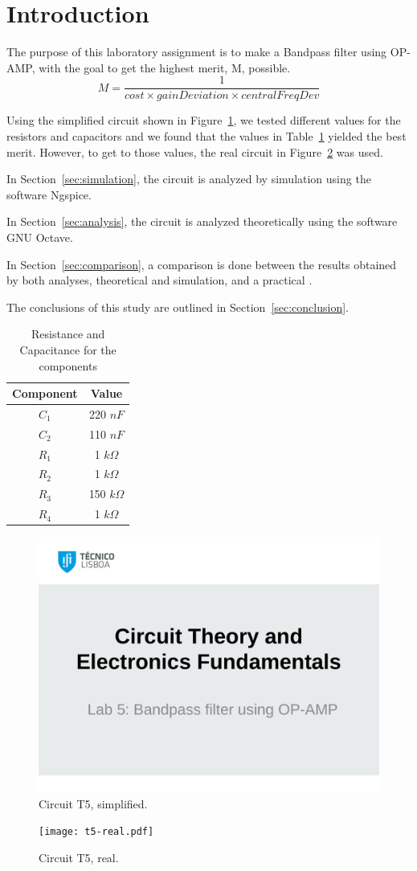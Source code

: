 \section{Introduction}
\label{sec:introduction}

The purpose of this laboratory assignment is to make a Bandpass filter using OP-AMP, with the goal to get the highest merit, M, possible.
$$ M = \frac{1}{cost \times gainDeviation \times centralFreqDev}$$

Using the simplified circuit shown in Figure~\ref{fig:t5}, we tested different values for the resistors and capacitors and we found that the values in Table~\ref{tab:values} yielded the best merit. However, to get to those values, the real circuit in Figure~\ref{fig:t5-real} was used.

In Section~\ref{sec:simulation}, the circuit is analyzed by simulation using the software Ngspice. 

In Section~\ref{sec:analysis}, the circuit is analyzed theoretically using the software GNU Octave. 

In Section~\ref{sec:comparison}, a comparison is done between the results obtained by both analyses, theoretical and simulation, and a practical .

The conclusions of this study are outlined in Section~\ref{sec:conclusion}.

\begin{table}[ht!]
    \centering
    \begin{tabular}{c c}
    \toprule
    Component & Value \\ \midrule
    $C_1$  & 220 $nF$      \\
    $C_2$  & 110 $nF$      \\
    $R_1$  & 1 $k\Omega$   \\
    $R_2$  & 1 $k\Omega$   \\
    $R_3$  & 150 $k\Omega$ \\
    $R_4$  & 1 $k\Omega$   \\ \bottomrule
    \end{tabular}
    \caption{Resistance and Capacitance for the components}
    \label{tab:values}
\end{table}

\begin{figure}[ht!]
\centering
    \includegraphics[width=0.8\linewidth]{t5.pdf}
\caption{Circuit T5, simplified.}
\label{fig:t5}
\end{figure}

\begin{figure}[ht!]
\centering
    \texttt{[image: t5-real.pdf]}
\caption{Circuit T5, real.}
\label{fig:t5-real}
\end{figure}

\FloatBarrier
\clearpage
